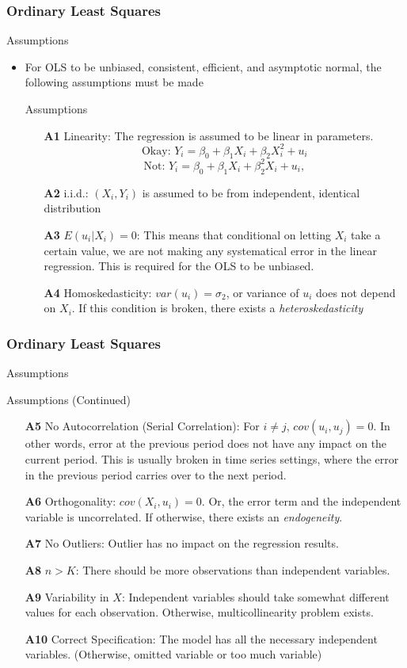 \documentclass[compress]{beamer}
\begin{document}
\begin{frame}
\frametitle{Ordinary Least Squares}
Assumptions
\begin{itemize}
\item For OLS to be unbiased, consistent, efficient, and asymptotic normal, the following assumptions must be made
\begin{block}{Assumptions}
\begin{itemize}
\item[\textbf{A1}] Linearity: The regression is assumed to be linear in parameters.
\[
\text{Okay: } Y_i = \beta_0 + \beta_1X_i + \beta_2X_i^2+u_i 
\]
\[
\text{Not: } Y_i = \beta_0 + \beta_1X_i + \beta_2^2X_i+u_i,
\]
\item[\textbf{A2}] i.i.d.: $(X_i,Y_i)$ is assumed to be from independent, identical distribution
\item[\textbf{A3}] $E(u_i|X_i)=0$: This means that conditional on letting $X_i$ take a certain value, we are not making any systematical error in the linear regression. This is required for the OLS to be unbiased. 
\item[\textbf{A4}] Homoskedasticity: $var(u_i)=\sigma_2$, or variance of $u_i$ does not depend on $X_i$. If this condition is broken, there exists a \textit{heteroskedasticity}
\end{itemize}
\end{block}
\end{itemize}
\end{frame}

\begin{frame}
\frametitle{Ordinary Least Squares}
Assumptions
\begin{block}{Assumptions (Continued)}
\begin{itemize}
\item[\textbf{A5}] No Autocorrelation (Serial Correlation): For $i\neq j$, $cov(u_i,u_j)=0$. In other words, error at the previous period does not have any impact on the current period. This is usually broken in time series settings, where the error in the previous period carries over to the next period.
\item[\textbf{A6}] Orthogonality: $cov(X_i,u_i)=0$. Or, the error term and the independent variable is uncorrelated. If otherwise, there exists an \textit{endogeneity}.
\item[\textbf{A7}] No Outliers: Outlier has no impact on the regression results.
\item[\textbf{A8}] $n>K$: There should be more observations than independent variables.
\item[\textbf{A9}] Variability in $X$: Independent variables should take somewhat different values for each observation. Otherwise, multicollinearity problem exists.
\item[\textbf{A10}] Correct Specification: The model has all the necessary independent variables. (Otherwise, omitted variable or too much variable)
\end{itemize}
\end{block}
\end{frame}
\end{document}
